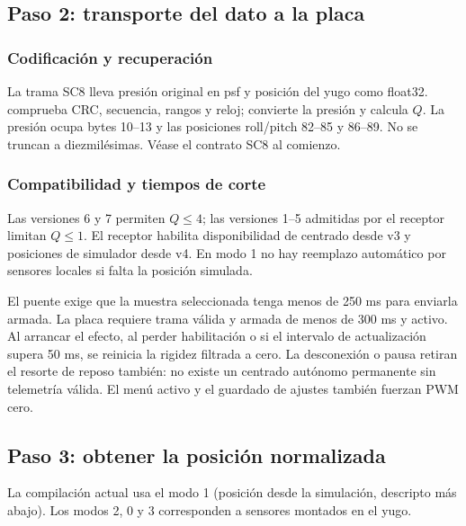 \subsection{Paso 2: transporte del dato a la placa}
\subsubsection{Codificación y recuperación}
La trama SC8 lleva presión original en psf y posición del yugo como float32.  comprueba CRC, secuencia, rangos y reloj;  convierte la presión y calcula $Q$. La presión ocupa bytes 10--13 y las posiciones roll/pitch 82--85 y 86--89. No se truncan a diezmilésimas. Véase el contrato SC8 al comienzo.

\subsubsection{Compatibilidad y tiempos de corte}
Las versiones 6 y 7 permiten $Q\le4$; las versiones 1--5 admitidas por el receptor limitan $Q\le1$. El receptor habilita disponibilidad de centrado desde v3 y posiciones de simulador desde v4. En modo 1 no hay reemplazo automático por sensores locales si falta la posición simulada.

El puente exige que la muestra seleccionada tenga menos de 250 ms para enviarla armada. La placa requiere trama válida y armada de menos de 300 ms y  activo. Al arrancar el efecto, al perder habilitación o si el intervalo de actualización supera 50 ms, se reinicia la rigidez filtrada a cero. La desconexión o pausa retiran el resorte de reposo también: no existe un centrado autónomo permanente sin telemetría válida. El menú activo y el guardado de ajustes también fuerzan PWM cero.

\subsection{Paso 3: obtener la posición normalizada}
La compilación actual usa el modo 1 (posición desde la simulación, descripto más abajo). Los modos 2, 0 y 3 corresponden a sensores montados en el yugo.

